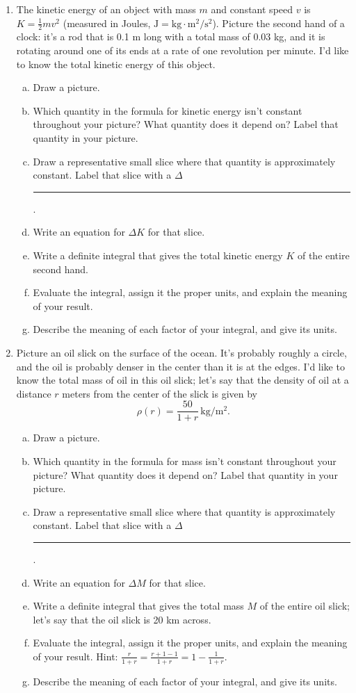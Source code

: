 \documentclass[12pt]{article}
\begin{document}
\begin{enumerate}
\item The kinetic energy of an object with mass \(m\) and constant speed \(v\) is \(K = \frac{1}{2} mv^2\) (measured in Joules, \(\unit{\J} = \unit{\kg \cdot \m^2 / \s ^2} \)). Picture the second hand of a clock: it's a rod that is 0.1 m long with a total mass of 0.03 kg, and it is rotating around one of its ends at a rate of one revolution per minute. I'd like to know the total kinetic energy of this object.
\begin{enumerate}[(a)]
\item Draw a picture.
\item Which quantity in the formula for kinetic energy isn't constant throughout your picture? What quantity does it depend on? Label that quantity in your picture.
\item Draw a representative small slice where that quantity is approximately constant. Label that slice with a \(\Delta\)\rule{0.5cm}{0.15mm}.
\item Write an equation for \(\Delta K\) for that slice.
\item Write a definite integral that gives the total kinetic energy \(K\) of the entire second hand.
\item Evaluate the integral, assign it the proper units, and explain the meaning of your result.
\item Describe the meaning of each factor of your integral, and give its units.
\end{enumerate}

\pagebreak

\item Picture an oil slick on the surface of the ocean. It's probably roughly a circle, and the oil is probably denser in the center than it is at the edges. I'd like to know the total mass of oil in this oil slick; let's say that the density of oil at a distance \(r\) meters from the center of the slick is given by \[\rho(r) = \dfrac{50}{1 + r}\, \unit{\kg / \m^2}.\]
\begin{enumerate}[(a)]
    \item Draw a picture.
    \item Which quantity in the formula for mass isn't constant throughout your picture? What quantity does it depend on? Label that quantity in your picture.
    \item Draw a representative small slice where that quantity is approximately constant. Label that slice with a \(\Delta\)\rule{0.5cm}{0.15mm}.
    \item Write an equation for \(\Delta M\) for that slice.
    \item Write a definite integral that gives the total mass \(M\) of the entire oil slick; let's say that the oil slick is 20 km across.
    \item Evaluate the integral, assign it the proper units, and explain the meaning of your result. Hint: \(\frac{r}{1+r} = \frac{r+1-1}{1+r} = 1 - \frac{1}{1+r}\).
    \item Describe the meaning of each factor of your integral, and give its units.
\end{enumerate}


\end{enumerate}
\end{document}
